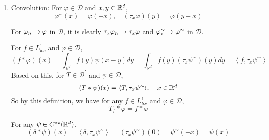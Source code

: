 \begin{enumerate}[label=\arabic*.]
	\begin{prop}
		For $T \in \mathcal{D}^\prime(\R)$, $T^\prime = 0$ implies $T$ is constant distribution, \emph{i.e.} $\inn{T, \varphi} = \inn{c,\varphi}$ for all $\varphi \in \mathcal{D}(\R)$.
	\end{prop}
	\begin{proof}
		Fix $\varphi_0 \in \mathcal{D}$ with $\int_\R \varphi_0(x)dx = 1$. The for any $\varphi \in \mathcal{D}$, there is a $\psi \in \mathcal{D}$ such that
		\begin{equation*}
			\varphi = \psi^\prime + \alpha \varphi_0,\quad \alpha = \inn{1,\varphi} = \int_\R \varphi(x) dx
		\end{equation*}
		In fact,
		\begin{equation*}
			\psi(x) = \int_{-\infty}^x (\varphi(t) - \alpha \varphi_0(t))dt
		\end{equation*}
		Let $c \defeq \inn{T,\varphi_0}$. Then by $T^\prime = 0$,
		\begin{equation*}
			\langle T, \varphi\rangle=\left\langle T, \psi^{\prime}\right\rangle+\alpha\left\langle T, \varphi_0\right\rangle=-\left\langle T^{\prime}, \psi\right\rangle+\alpha c=c\langle 1, \varphi\rangle
		\end{equation*}
	\end{proof}

	\item Convolution: For $\varphi \in \mathcal{D}$ and $x,y \in \mathbb{R}^d$,
	\begin{equation*}
		\varphi^\sim(x) = \varphi(-x),\quad \left(\tau_x \varphi\right)(y)=\varphi(y-x)
	\end{equation*}
	\begin{rmk}
		For $\varphi_n \rightarrow \varphi$ in $\mathcal{D}$, it is clearly $\tau_x\varphi_n \rightarrow \tau_x\varphi$ and $\varphi_n^\sim \rightarrow \varphi^\sim$ in $\mathcal{D}$.
	\end{rmk}
	For $f \in L^1_{loc}$ and $\varphi \in \mathcal{D}$,
	\begin{equation*}
		(f * \varphi)(x) = \int_{\mathbb{R}^d} f(y) \psi(x-y) d y=\int_{\mathbb{R}^d} f(y)\left(\tau_x \psi^{\sim}\right)(y) d y=\left\langle f, \tau_x \psi^{\sim}\right\rangle
	\end{equation*}
	Based on this, for $T \in \mathcal{D}^\prime$ and $\psi \in \mathcal{D}$,
	\begin{equation*}
		(T * \psi)(x) = \langle T, \tau_x \psi^{\sim} \rangle,\quad x \in \mathbb{R}^d
	\end{equation*}
	So by this definition, we have for any $f \in L^1_{loc}$ and $\varphi \in \mathcal{D}$,
	\begin{equation*}
		T_f * \varphi = f * \varphi
	\end{equation*}
	\begin{exam}
		For any $\psi \in C^\infty(\mathbb{R}^d)$,
		\begin{equation*}
			(\delta * \psi)(x)=\left\langle\delta, \tau_x \psi^{\sim}\right\rangle=\left(\tau_x \psi^{\sim}\right)(0)=\psi^{\sim}(-x)=\psi(x)
		\end{equation*}
	\end{exam}


\end{enumerate}
